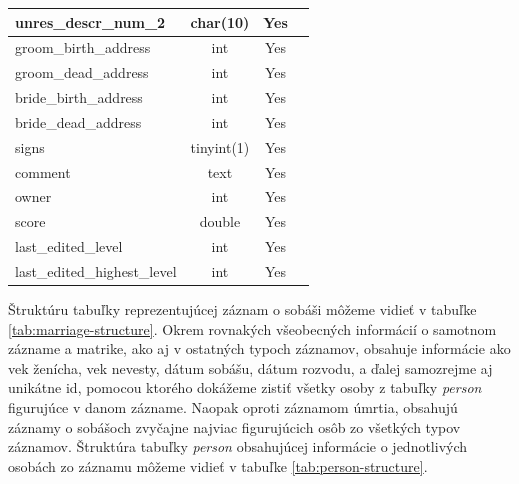 \begin{longtable}{|l|c|c|c|}
unres\_descr\_num\_2 & char(10) & Yes \\ \hline
groom\_birth\_address & int & Yes \\ \hline
groom\_dead\_address & int & Yes \\ \hline
bride\_birth\_address & int & Yes \\ \hline
bride\_dead\_address & int & Yes \\ \hline
signs & tinyint(1) & Yes \\ \hline
comment & text & Yes \\ \hline
owner & int & Yes \\ \hline
score & double & Yes \\ \hline
last\_edited\_level & int & Yes \\ \hline
last\_edited\_highest\_level & int & Yes \\ \hline
 \end{longtable}

Štruktúru tabuľky reprezentujúcej záznam o sobáši môžeme vidieť v tabuľke \ref{tab:marriage-structure}. Okrem rovnakých všeobecných informácií o samotnom zázname a matrike, ako aj v ostatných typoch záznamov, obsahuje informácie ako vek ženícha, vek nevesty, dátum sobášu, dátum rozvodu, a ďalej samozrejme aj unikátne id, pomocou ktorého dokážeme zistiť všetky osoby z tabuľky \textit{person} figurujúce v danom zázname. Naopak oproti záznamom úmrtia, obsahujú záznamy o sobášoch zvyčajne najviac figurujúcich osôb zo všetkých typov záznamov. Štruktúra tabuľky \textit{person} obsahujúcej informácie o jednotlivých osobách zo záznamu môžeme vidieť v tabuľke \ref{tab:person-structure}.

